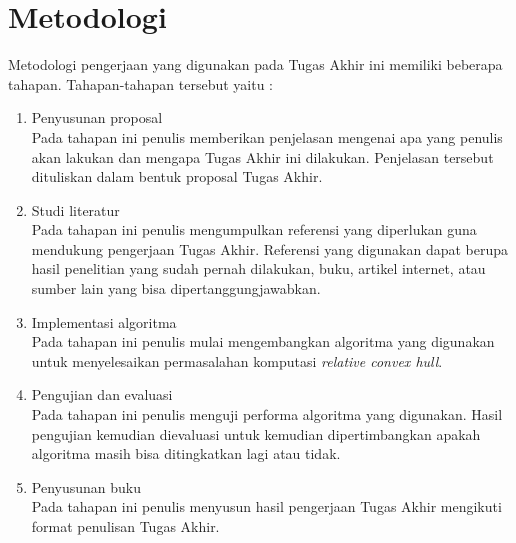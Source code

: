 \section {Metodologi}
Metodologi pengerjaan yang digunakan pada Tugas Akhir ini memiliki beberapa tahapan. Tahapan-tahapan tersebut yaitu :

\begin{enumerate}
    \item Penyusunan proposal\\
    Pada tahapan ini penulis memberikan penjelasan mengenai apa yang penulis akan lakukan dan mengapa Tugas Akhir ini dilakukan. Penjelasan tersebut dituliskan dalam bentuk proposal Tugas Akhir.
    \item Studi literatur\\
    Pada tahapan ini penulis mengumpulkan referensi yang diperlukan guna mendukung pengerjaan Tugas Akhir. Referensi yang digunakan dapat berupa hasil penelitian yang sudah pernah dilakukan, buku, artikel internet, atau sumber lain yang bisa dipertanggungjawabkan.
    \item Implementasi algoritma\\
    Pada tahapan ini penulis mulai mengembangkan algoritma yang digunakan untuk menyelesaikan permasalahan komputasi \textit{relative convex hull}.
    \item Pengujian dan evaluasi\\
    Pada tahapan ini penulis menguji performa algoritma yang digunakan. Hasil pengujian kemudian dievaluasi untuk kemudian dipertimbangkan apakah algoritma masih bisa ditingkatkan lagi atau tidak.
    \item Penyusunan buku\\
    Pada tahapan ini penulis menyusun hasil pengerjaan Tugas Akhir mengikuti format penulisan Tugas Akhir.
\end{enumerate}

